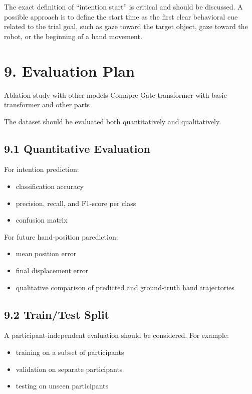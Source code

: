 \documentclass[11pt,a4paper]{article}
\begin{document}
The exact definition of ``intention start'' is critical and should be discussed. A possible approach is to define the start time as the first clear behavioral cue related to the trial goal, such as gaze toward the target object, gaze toward the robot, or the beginning of a hand movement.

\section*{9. Evaluation Plan}

Ablation study with other models
Comapre Gate transformer with basic transformer and other parts

The dataset should be evaluated both quantitatively and qualitatively.

\subsection*{9.1 Quantitative Evaluation}

For intention prediction:
\begin{itemize}
    \item classification accuracy
    \item precision, recall, and F1-score per class
    \item confusion matrix
\end{itemize}

For future hand-position parediction:
\begin{itemize}
    \item mean position error
    \item final displacement error
    \item qualitative comparison of predicted and ground-truth hand trajectories
\end{itemize}

\subsection*{9.2 Train/Test Split}

A participant-independent evaluation should be considered. For example:

\begin{itemize}
    \item training on a subset of participants
    \item validation on separate participants
    \item testing on unseen participants
\end{itemize}
\end{document}
